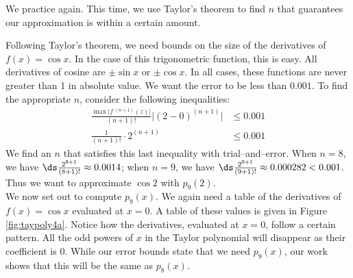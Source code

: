 We practice again. This time, we use Taylor's theorem to find $n$ that guarantees our approximation is within a certain amount.\\

{Following Taylor's theorem, we need bounds on the size of the derivatives of $f(x)=\cos x$. In the case of this trigonometric function, this is easy. All derivatives of cosine are $\pm \sin x$ or $\pm \cos x$. In all cases, these functions are never greater than 1 in absolute value. We want the error to be less than $0.001$. To find the appropriate $n$, consider the following inequalities:
\begin{align*}
\frac{\max\big|f\,^{(n+1)}(z)\big|}{(n+1)!}\big|(2-0)^{(n+1)}\big| &\leq 0.001 \\
\frac1{(n+1)!}\cdot2^{(n+1)} &\leq 0.001
\end{align*}
We find an $n$ that satisfies this last inequality with trial--and--error. When $n=8$, we have $\ds \frac{2^{8+1}}{(8+1)!} \approx 0.0014$; when $n=9$, we have $\ds \frac{2^{9+1}}{(9+1)!} \approx 0.000282 <0.001$. Thus we want to approximate $\cos 2$ with $p_9(2)$.\\

We now set out to compute $p_9(x)$. We again need a table of the derivatives of $f(x)=\cos x$ evaluated at $x=0$. A table of these values is given in Figure \ref{fig:taypoly4a}.
Notice how the derivatives, evaluated at $x=0$, follow a certain pattern. All the odd powers of $x$ in the Taylor polynomial will disappear as their coefficient is 0. While our error bounds state that we need $p_9(x)$, our work shows that this will be the same as $p_8(x)$. 

}
